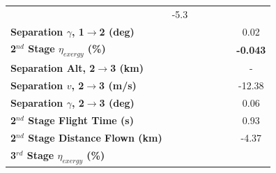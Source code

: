 \begin{table}[ht!]
\begin{tabular}{l c c c c c c}
		&-5.3
		\\
		\textbf{Separation $\gamma$, 1$\rightarrow$2 (deg)}
		& \firstsecondSeparationgammaCdNinetyNoReturn
		& \firstsecondSeparationgammaCdNinetyFiveNoReturn
		& \firstsecondSeparationgammaCdStandardNoReturn
		& \firstsecondSeparationgammaCdOneHundredFiveNoReturn
		& \firstsecondSeparationgammaCdOneHundredTenNoReturn
		&0.02
		\\
		\hline 
		\textbf{2$^{nd}$ Stage $\eta_{exergy}$ (\%)}
		& \textbf{\secondExergyEffCdNinetyNoReturn}
		& \textbf{\secondExergyEffCdNinetyFiveNoReturn}
		& \textbf{\secondExergyEffCdStandardNoReturn}
		& \textbf{\secondExergyEffCdOneHundredFiveNoReturn}
		& \textbf{\secondExergyEffCdOneHundredTenNoReturn}
		& \textbf{-0.043}
		\\
		\textbf{Separation Alt, 2$\rightarrow$3 (km)}
		& \secondthirdSeparationAltCdNinetyNoReturn
		& \secondthirdSeparationAltCdNinetyFiveNoReturn
		& \secondthirdSeparationAltCdStandardNoReturn
		& \secondthirdSeparationAltCdOneHundredFiveNoReturn
		& \secondthirdSeparationAltCdOneHundredTenNoReturn
		& -
		\\
		\textbf{Separation $v$, 2$\rightarrow$3 (m/s)}
		& \secondthirdSeparationvCdNinetyNoReturn
		& \secondthirdSeparationvCdNinetyFiveNoReturn
		& \secondthirdSeparationvCdStandardNoReturn
		& \secondthirdSeparationvCdOneHundredFiveNoReturn
		& \secondthirdSeparationvCdOneHundredTenNoReturn
		&-12.38
		\\
		\textbf{Separation $\gamma$, 2$\rightarrow$3 (deg)}
		& \secondthirdSeparationgammaCdNinetyNoReturn
		& \secondthirdSeparationgammaCdNinetyFiveNoReturn
		& \secondthirdSeparationgammaCdStandardNoReturn
		& \secondthirdSeparationgammaCdOneHundredFiveNoReturn
		& \secondthirdSeparationgammaCdOneHundredTenNoReturn
		&0.06
		\\
		\textbf{2$^{nd}$ Stage Flight Time (s)}
		& \secondFlightTimeCdNinetyNoReturn
		& \secondFlightTimeCdNinetyFiveNoReturn
		& \secondFlightTimeCdStandardNoReturn
		& \secondFlightTimeCdOneHundredFiveNoReturn
		& \secondFlightTimeCdOneHundredTenNoReturn
		&0.93
		\\
		\textbf{2$^{nd}$ Stage Distance Flown (km)}
		& \SecondDistCdNinetyNoReturn
		& \SecondDistCdNinetyFiveNoReturn
		& \SecondDistCdStandardNoReturn
		& \SecondDistCdOneHundredFiveNoReturn
		& \SecondDistCdOneHundredTenNoReturn
		&-4.37
		\\
		\hline 
		\textbf{3$^{rd}$ Stage $\eta_{exergy}$ (\%)}
		& \textbf{\thirddExergyEffCdNinetyNoReturn}
		& \textbf{\thirddExergyEffCdNinetyFiveNoReturn}
		& \textbf{\thirddExergyEffCdStandardNoReturn}

\end{tabular}
\end{table}
